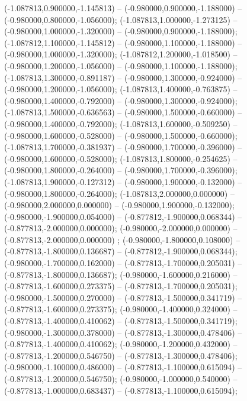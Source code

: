  (-1.087813,0.900000,-1.145813) -- (-0.980000,0.900000,-1.188000) -- (-0.980000,0.800000,-1.056000);
 (-1.087813,1.000000,-1.273125) -- (-0.980000,1.000000,-1.320000) -- (-0.980000,0.900000,-1.188000);
 (-1.087812,1.100000,-1.145812) -- (-0.980000,1.100000,-1.188000) -- (-0.980000,1.000000,-1.320000);
 (-1.087812,1.200000,-1.018500) -- (-0.980000,1.200000,-1.056000) -- (-0.980000,1.100000,-1.188000);
 (-1.087813,1.300000,-0.891187) -- (-0.980000,1.300000,-0.924000) -- (-0.980000,1.200000,-1.056000);
 (-1.087813,1.400000,-0.763875) -- (-0.980000,1.400000,-0.792000) -- (-0.980000,1.300000,-0.924000);
 (-1.087813,1.500000,-0.636563) -- (-0.980000,1.500000,-0.660000) -- (-0.980000,1.400000,-0.792000);
 (-1.087813,1.600000,-0.509250) -- (-0.980000,1.600000,-0.528000) -- (-0.980000,1.500000,-0.660000);
 (-1.087813,1.700000,-0.381937) -- (-0.980000,1.700000,-0.396000) -- (-0.980000,1.600000,-0.528000);
 (-1.087813,1.800000,-0.254625) -- (-0.980000,1.800000,-0.264000) -- (-0.980000,1.700000,-0.396000);
 (-1.087813,1.900000,-0.127312) -- (-0.980000,1.900000,-0.132000) -- (-0.980000,1.800000,-0.264000);
 (-1.087813,2.000000,0.000000) -- (-0.980000,2.000000,0.000000) -- (-0.980000,1.900000,-0.132000);
 (-0.980000,-1.900000,0.054000) -- (-0.877812,-1.900000,0.068344) -- (-0.877813,-2.000000,0.000000);
 (-0.980000,-2.000000,0.000000) -- (-0.877813,-2.000000,0.000000) ;
 (-0.980000,-1.800000,0.108000) -- (-0.877813,-1.800000,0.136687) -- (-0.877812,-1.900000,0.068344);
 (-0.980000,-1.700000,0.162000) -- (-0.877813,-1.700000,0.205031) -- (-0.877813,-1.800000,0.136687);
 (-0.980000,-1.600000,0.216000) -- (-0.877813,-1.600000,0.273375) -- (-0.877813,-1.700000,0.205031);
 (-0.980000,-1.500000,0.270000) -- (-0.877813,-1.500000,0.341719) -- (-0.877813,-1.600000,0.273375);
 (-0.980000,-1.400000,0.324000) -- (-0.877813,-1.400000,0.410062) -- (-0.877813,-1.500000,0.341719);
 (-0.980000,-1.300000,0.378000) -- (-0.877813,-1.300000,0.478406) -- (-0.877813,-1.400000,0.410062);
 (-0.980000,-1.200000,0.432000) -- (-0.877813,-1.200000,0.546750) -- (-0.877813,-1.300000,0.478406);
 (-0.980000,-1.100000,0.486000) -- (-0.877813,-1.100000,0.615094) -- (-0.877813,-1.200000,0.546750);
 (-0.980000,-1.000000,0.540000) -- (-0.877813,-1.000000,0.683437) -- (-0.877813,-1.100000,0.615094);
